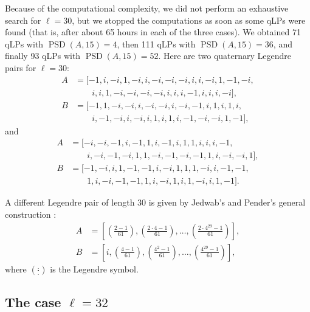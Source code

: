 \documentclass{article}
\theoremstyle{definition}
\newcommand{\PSD}{\operatorname{PSD}}
\begin{document}
Because of the computational complexity, we did not perform an exhaustive search for $\ell=30$, but we stopped the computations as soon as some qLPs were found (that is, after about 65 hours in each of the three cases). We obtained 71 qLPs with $\PSD(A,15)=4$, then 111 qLPs with $\PSD(A,15)=36$, and finally 93 qLPs with $\PSD(A,15)=52$. Here are two quaternary Legendre pairs for $\ell=30$: 
\begin{align*}
A &= [-1, i, -i, 1, -i, i, -i, -i, -i, i, i, -i, 1, -1, -i,\\
&\qquad i, i, 1, -i, -i, -i, -i, i, i, i, -1, i, i, i, -i],\\
B &= [-1, 1, -i, -i, i, -i, -i, i, -i, -1, i, 1, i, 1, i,\\
&\qquad i, -1, -i, i, -i, i, 1, i, 1, i, -1, -i, -i, 1, -1],
\end{align*}
and
\begin{align*}
A &= [-i, -i, -1, i, -1, 1, i, -1, i, 1, 1, i, i, i, -1,\\
&\qquad i, -i, -1, -i, 1, 1, -i, -1, -i, -1, 1, i, -i, -i, 1],\\
B &= [-1, -i, i, 1, -1, -1, i, -i, 1, 1, 1, -i, i, -1, -1,\\
&\qquad 1, i, -i, -1, -1, 1, i, -i, 1, i, 1, -i, i, 1, -1].
\end{align*}

A different Legendre pair of length $30$ is given by Jedwab's and Pender's general construction \cite{jp24}:
\begin{align*}
A &= \left[\left(\frac{2-1}{61}\right),\left(\frac{2\cdot 4-1}{61}\right),\ldots,\left(\frac{2\cdot 4^{29}-1}{61}\right)\right],\\
B &= \left[i,\left(\frac{4-1}{61}\right),\left(\frac{4^2-1}{61}\right),\ldots,\left(\frac{4^{29}-1}{61}\right)\right],
\end{align*}
where $\left(\frac{.}{.}\right)$ is the Legendre symbol.


\subsection{The case \texorpdfstring{$\ell=32$}{l=32}}
\end{document}
